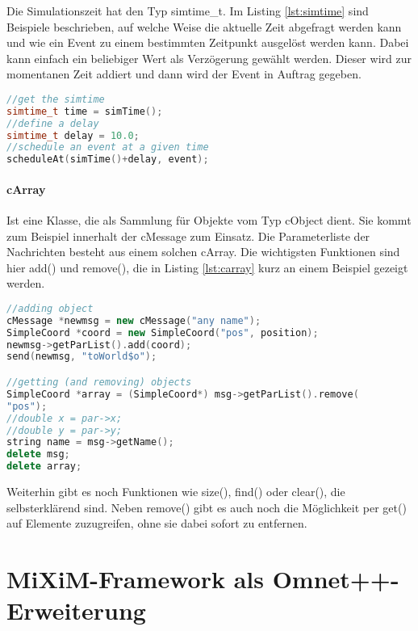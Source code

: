 Die Simulationszeit hat den Typ simtime\_t. Im Listing \ref{lst:simtime} sind Beispiele beschrieben, auf welche Weise die aktuelle Zeit abgefragt werden kann und wie ein Event zu einem bestimmten Zeitpunkt ausgelöst werden kann. Dabei kann einfach ein beliebiger Wert als Verzögerung gewählt werden. Dieser wird zur momentanen Zeit addiert und dann wird der Event in Auftrag gegeben.

\begin{minipage}{\textwidth}
\begin{lstlisting}[language=C++,caption={Simulationszeit und Event},label=lst:simtime]
//get the simtime
simtime_t time = simTime();
//define a delay
simtime_t delay = 10.0;
//schedule an event at a given time
scheduleAt(simTime()+delay, event);
\end{lstlisting}
\end{minipage}

\paragraph{cArray} Ist eine Klasse, die als Sammlung für Objekte vom Typ cObject dient. Sie kommt zum Beispiel innerhalt der cMessage zum Einsatz. Die Parameterliste der Nachrichten besteht aus einem solchen cArray. Die wichtigsten Funktionen sind hier add() und remove(), die in Listing \ref{lst:carray} kurz an einem Beispiel gezeigt werden.

\begin{minipage}{\textwidth}
\begin{lstlisting}[language=C++,caption={cArray add und remove},label=lst:carray]
//adding object
cMessage *newmsg = new cMessage("any name");
SimpleCoord *coord = new SimpleCoord("pos", position);
newmsg->getParList().add(coord);
send(newmsg, "toWorld$o");

//getting (and removing) objects
SimpleCoord *array = (SimpleCoord*) msg->getParList().remove(
"pos");
//double x = par->x;
//double y = par->y;
string name = msg->getName();
delete msg;
delete array;

\end{lstlisting}
\end{minipage}

Weiterhin gibt es noch Funktionen wie size(), find() oder clear(), die selbsterklärend sind. Neben remove() gibt es auch noch die Möglichkeit per get() auf Elemente zuzugreifen, ohne sie dabei sofort zu entfernen.

\section{MiXiM-Framework als Omnet++-Erweiterung}

